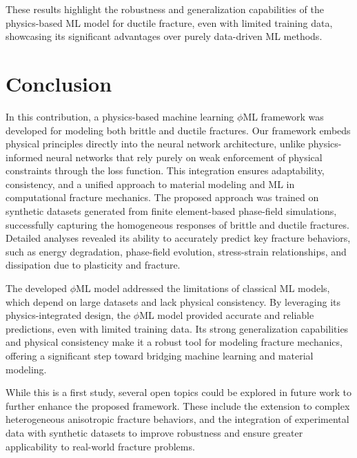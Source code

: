 \documentclass[final,3p,times]{elsarticle}
\begin{document}
These results highlight the robustness and generalization capabilities of the physics-based ML model for ductile fracture, even with limited training data, showcasing its significant advantages over purely data-driven ML methods.


\section{Conclusion}
\label{sec6}

In this contribution, a physics-based machine learning $\phi$ML framework was developed for modeling both brittle and ductile fractures. Our framework embeds physical principles directly into the neural network architecture, unlike physics-informed neural networks that rely purely on weak enforcement of physical constraints through the loss function. This integration ensures adaptability, consistency, and a unified approach to material modeling and ML in computational fracture mechanics. The proposed approach was trained on synthetic datasets generated from finite element-based phase-field simulations, successfully capturing the homogeneous responses of brittle and ductile fractures. Detailed analyses revealed its ability to accurately predict key fracture behaviors, such as energy degradation, phase-field evolution, stress-strain relationships, and dissipation due to plasticity and fracture.

The developed $\phi$ML model addressed the limitations of classical ML models, which depend on large datasets and lack physical consistency. By leveraging its physics-integrated design, the $\phi$ML model provided accurate and reliable predictions, even with limited training data. Its strong generalization capabilities and physical consistency make it a robust tool for modeling fracture mechanics, offering a significant step toward bridging machine learning and material modeling.

While this is a first study, several open topics could be explored in future work to further enhance the proposed framework. These include the extension to complex heterogeneous anisotropic fracture behaviors, and the integration of experimental data with synthetic datasets to improve robustness and ensure greater applicability to real-world fracture problems.





\end{document}
